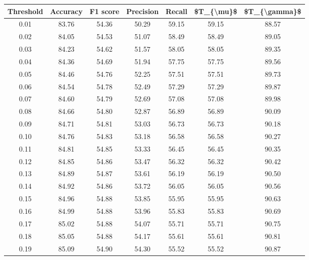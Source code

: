 \begin{tabular}{|c|c|c|c|c|c|c|}
\hline
 Threshold &  Accuracy &  F1 score &  Precision &  Recall &  \$T\_\{\textbackslash mu\}\$ &  \$T\_\{\textbackslash gamma\}\$ \\
\hline
      0.01 &     83.76 &     54.36 &      50.29 &   59.15 &      59.15 &         88.57 \\
      0.02 &     84.05 &     54.53 &      51.07 &   58.49 &      58.49 &         89.05 \\
      0.03 &     84.23 &     54.62 &      51.57 &   58.05 &      58.05 &         89.35 \\
      0.04 &     84.36 &     54.69 &      51.94 &   57.75 &      57.75 &         89.56 \\
      0.05 &     84.46 &     54.76 &      52.25 &   57.51 &      57.51 &         89.73 \\
      0.06 &     84.54 &     54.78 &      52.49 &   57.29 &      57.29 &         89.87 \\
      0.07 &     84.60 &     54.79 &      52.69 &   57.08 &      57.08 &         89.98 \\
      0.08 &     84.66 &     54.80 &      52.87 &   56.89 &      56.89 &         90.09 \\
      0.09 &     84.71 &     54.81 &      53.03 &   56.73 &      56.73 &         90.18 \\
      0.10 &     84.76 &     54.83 &      53.18 &   56.58 &      56.58 &         90.27 \\
      0.11 &     84.81 &     54.85 &      53.33 &   56.45 &      56.45 &         90.35 \\
      0.12 &     84.85 &     54.86 &      53.47 &   56.32 &      56.32 &         90.42 \\
      0.13 &     84.89 &     54.87 &      53.61 &   56.19 &      56.19 &         90.50 \\
      0.14 &     84.92 &     54.86 &      53.72 &   56.05 &      56.05 &         90.56 \\
      0.15 &     84.96 &     54.88 &      53.85 &   55.95 &      55.95 &         90.63 \\
      0.16 &     84.99 &     54.88 &      53.96 &   55.83 &      55.83 &         90.69 \\
      0.17 &     85.02 &     54.88 &      54.07 &   55.71 &      55.71 &         90.75 \\
      0.18 &     85.05 &     54.88 &      54.17 &   55.61 &      55.61 &         90.81 \\
      0.19 &     85.09 &     54.90 &      54.30 &   55.52 &      55.52 &         90.87 \\

\end{tabular}

